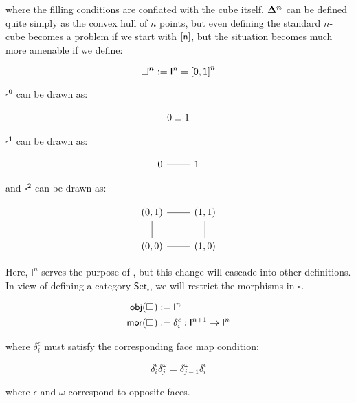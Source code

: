 \documentclass[10pt]{art}
\newcommand{\Cube}[1]{\ensuremath{\boldsymbol{\square^{#1}}}}
\renewcommand{\I}[1]{\ensuremath{\mathsf{I}^{#1}}}
\newcommand{\CSet}{\ensuremath{\mathsf{Set}_{\boldsymbol{\square}}}}
\begin{document}
where the filling conditions are conflated with the cube itself. $\boldsymbol{\Delta^{n}}$ can be defined quite simply as the convex hull of $n$ points, but even defining the standard $n$-cube becomes a problem if we start with $\mathsf{[n]}$, but the situation becomes much more amenable if we define:

\begin{definition}[\Cube{n}]
  \begin{equation*}
    \Cube{n} := \I{n} = \sq{0, 1}^n
  \end{equation*}
\end{definition}

\begin{example}[$\Cube{0}$, $\Cube{1}$ and $\Cube{2}$]
  $\Cube{0}$ can be drawn as:

  $$
    \begin{tikzcd}
      0 \equiv 1
    \end{tikzcd}
  $$

  $\Cube{1}$ can be drawn as:

  $$
    \begin{tikzcd}
      0 \arrow[r, dash] & 1
    \end{tikzcd}
  $$

  and $\Cube{2}$ can be drawn as:

  $$
    \begin{tikzcd}
      (0, 1) \arrow[r, dash] & (1, 1) \arrow[d, dash] \\
      (0, 0) \arrow[u, dash] & (1, 0) \arrow[l, dash]
    \end{tikzcd}
  $$
\end{example}

Here, $\I{n}$ serves the purpose of , but this change will cascade into other definitions. In view of defining a category \CSet, we will restrict the morphisms in \Cube{}.

\begin{definition}[\Cube{}]
  \begin{align*}
    \obj(\Cube{}) & := \I{n}                                           \\
    \mor(\Cube{}) & := \delta^\epsilon_i : \I{n + 1} \rightarrow \I{n}
  \end{align*}

  where $\delta^\epsilon_i$ must satisfy the corresponding face map condition:

  \begin{equation*}
    \delta^\epsilon_i \delta^\omega_j = \delta^\omega_{j - 1} \delta^\epsilon_i
  \end{equation*}

  where $\epsilon$ and $\omega$ correspond to opposite faces.
\end{definition}
\end{document}
